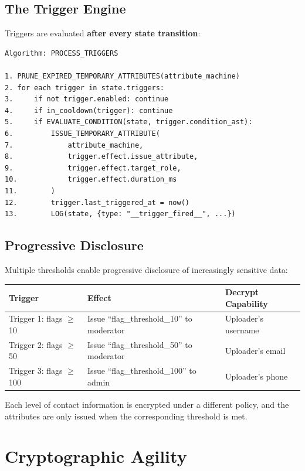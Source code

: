 \documentclass[11pt,a4paper]{article}
\begin{document}
\subsection{The Trigger Engine}

Triggers are evaluated \textbf{after every state transition}:

\begin{lstlisting}
Algorithm: PROCESS_TRIGGERS

1. PRUNE_EXPIRED_TEMPORARY_ATTRIBUTES(attribute_machine)
2. for each trigger in state.triggers:
3.     if not trigger.enabled: continue
4.     if in_cooldown(trigger): continue
5.     if EVALUATE_CONDITION(state, trigger.condition_ast):
6.         ISSUE_TEMPORARY_ATTRIBUTE(
7.             attribute_machine,
8.             trigger.effect.issue_attribute,
9.             trigger.effect.target_role,
10.            trigger.effect.duration_ms
11.        )
12.        trigger.last_triggered_at = now()
13.        LOG(state, {type: "__trigger_fired__", ...})
\end{lstlisting}

\subsection{Progressive Disclosure}

Multiple thresholds enable progressive disclosure of increasingly sensitive data:

\vspace{4pt}
\begin{tabularx}{\textwidth}{l>{\hsize=1.2\hsize}X>{\hsize=0.8\hsize}X}
\toprule
\textbf{Trigger} & \textbf{Effect} & \textbf{Decrypt Capability} \\
\midrule
Trigger 1: flags $\geq$ 10 & Issue ``flag\_threshold\_10'' to moderator & Uploader's username \\
Trigger 2: flags $\geq$ 50 & Issue ``flag\_threshold\_50'' to moderator & Uploader's email \\
Trigger 3: flags $\geq$ 100 & Issue ``flag\_threshold\_100'' to admin & Uploader's phone \\
\bottomrule
\end{tabularx}

\noindent Each level of contact information is encrypted under a different policy, and the attributes are only issued when the corresponding threshold is met.

\section{Cryptographic Agility}
\end{document}

